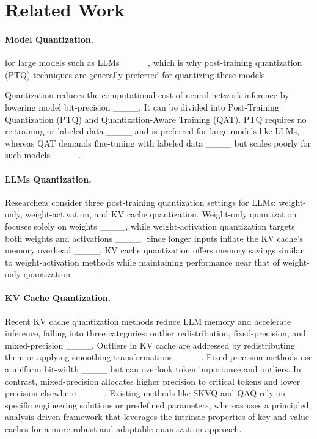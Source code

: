 \section{Related Work}
\label{sec:related}

\paragraph{Model Quantization.} 
 for large models such as LLMs ____, which is why post-training quantization (PTQ) techniques are generally preferred for quantizing these models.

Quantization reduces the computational cost of neural network inference by lowering model bit-precision ____. It can be divided into Post-Training Quantization (PTQ) and Quantization-Aware Training (QAT). PTQ requires no re-training or labeled data ____ and is preferred for large models like LLMs, whereas QAT demands fine-tuning with labeled data ____ but scales poorly for such models ____.

\paragraph{LLMs Quantization.} 


Researchers consider three post-training quantization settings for LLMs: weight-only, weight-activation, and KV cache quantization. Weight-only quantization focuses solely on weights ____, while weight-activation quantization targets both weights and activations ____. Since longer inputs inflate the KV cache’s memory overhead ____, KV cache quantization offers memory savings similar to weight-activation methods while maintaining performance near that of weight-only quantization ____.

\paragraph{KV Cache Quantization.} 

Recent KV cache quantization methods reduce LLM memory and accelerate inference, falling into three categories: outlier redistribution, fixed-precision, and mixed-precision ____. Outliers in KV cache are addressed by redistributing them or applying smoothing transformations ____. Fixed-precision methods use a uniform bit-width ____ but can overlook token importance and outliers. In contrast, mixed-precision allocates higher precision to critical tokens and lower precision elsewhere ____.
Existing methods like SKVQ and QAQ rely on specific engineering solutions or predefined parameters, whereas \mn{} uses a principled, analysis-driven framework that leverages the intrinsic properties of key and value caches for a more robust and adaptable quantization approach.